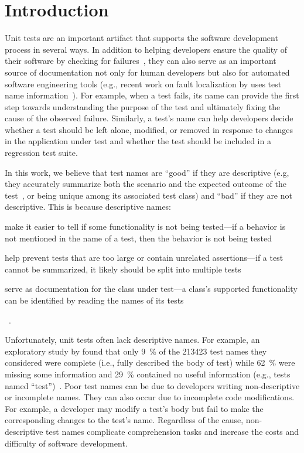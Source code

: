 \section{Introduction}
\label{sec:introduction}

Unit tests are an important artifact that supports the software development process in several ways.
In addition to helping developers ensure the quality of their software by checking for failures~\cite{daka2014survey}, they can also serve as an important source of documentation not only for human developers but also for automated software engineering tools (e.g., recent work on fault localization by \citeauthor{li2019deepfl} uses test name information~\cite{li2019deepfl}).
%
For example, when a test fails, its name can provide the first step towards understanding the purpose of the test and ultimately fixing the cause of the observed failure.
%
Similarly, a test's name can help developers decide whether a test should be left alone, modified, or removed in response to changes in the application under test and whether the test should be included in a regression test suite.


In this work, we believe that test names are \enquote{good} if they are descriptive (e.g, they accurately summarize both the scenario and the expected outcome of the test~\cite{trenk14}, or being unique among its associated test class) and \enquote{bad} if they are not descriptive.
%
This is because descriptive names:
\begin{enumerate*}
\item make it easier to tell if some functionality is not being tested---if a behavior is not mentioned in the name of a test, then the behavior is not being tested
\item help prevent tests that are too large or contain unrelated assertions---if a test cannot be summarized, it likely should be split into multiple tests
\item serve as documentation for the class under test---a class's supported functionality can be identified by reading the names of its tests
\end{enumerate*}~\cite{zhang2015automatically}.


Unfortunately, unit tests often lack descriptive names.
%
For example, an exploratory study by \citeauthor{zhang2015automatically} found that only \SI{9}{\percent} of the \num{213423} test names they considered were complete (i.e., fully described the body of test) while \SI{62}{\percent} were missing some information and \SI{29}{\percent} contained no useful information (e.g., tests named \enquote{test})~\cite{zhang2015automatically}.
%
Poor test names can be due to developers writing non-descriptive or incomplete names.
%
They can also occur due to incomplete code modifications.
%
For example, a developer may modify a test's body but fail to make the corresponding changes to the test's name.
%
Regardless of the cause, non-descriptive test names complicate comprehension tasks and increase the costs and difficulty of software development.


